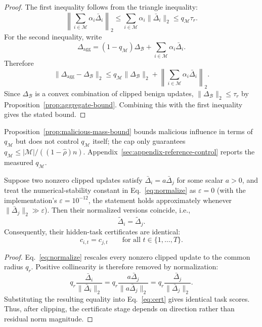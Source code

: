 \begin{proof}
The first inequality follows from the triangle inequality:
\[
\left\|\sum_{i\in\mathcal{M}}\alpha_i\bar{\Delta}_i\right\|_2
\le
\sum_{i\in\mathcal{M}}\alpha_i\|\bar{\Delta}_i\|_2
\le q_{\mathcal{M}}\tau_r.
\]
For the second inequality, write
\[
\Delta_{\mathrm{agg}}=
(1-q_{\mathcal{M}})\Delta_{\mathcal{B}}
+\sum_{i\in\mathcal{M}}\alpha_i\bar{\Delta}_i.
\]
Therefore
\[
\|\Delta_{\mathrm{agg}}-\Delta_{\mathcal{B}}\|_2
\le
q_{\mathcal{M}}\|\Delta_{\mathcal{B}}\|_2
+\left\|\sum_{i\in\mathcal{M}}\alpha_i\bar{\Delta}_i\right\|_2.
\]
Since $\Delta_{\mathcal{B}}$ is a convex combination of clipped benign updates, $\|\Delta_{\mathcal{B}}\|_2\le\tau_r$ by Proposition~\ref{prop:aggregate-bound}. Combining this with the first inequality gives the stated bound.
\end{proof}

Proposition~\ref{prop:malicious-mass-bound} bounds malicious influence in terms of $q_{\mathcal{M}}$ but does not control $q_{\mathcal{M}}$ itself; the cap only guarantees $q_{\mathcal{M}}\le|\mathcal{M}|/((1-\hat{\rho})n)$. Appendix~\ref{sec:appendix-reference-control} reports the measured $q_{\mathcal{M}}$.

\begin{proposition}
\label{prop:directional-invariance}
Suppose two nonzero clipped updates satisfy $\bar{\Delta}_i = a \bar{\Delta}_j$ for some scalar $a>0$, and treat the numerical-stability constant in Eq.~\eqref{eq:normalize} as $\varepsilon=0$ (with the implementation's $\varepsilon=10^{-12}$, the statement holds approximately whenever $\|\bar{\Delta}_j\|_2\gg\varepsilon$). Then their normalized versions coincide, i.e.,
\[
\tilde{\Delta}_i=\tilde{\Delta}_j.
\]
Consequently, their hidden-task certificates are identical:
\[
c_{i,t}=c_{j,t}\qquad \text{for all } t \in \{1,\dots,T\}.
\]
\end{proposition}

\begin{proof}
Eq.~\eqref{eq:normalize} rescales every nonzero clipped update to the common radius $q_r$. Positive collinearity is therefore removed by normalization:
\[
q_r\frac{\bar{\Delta}_i}{\|\bar{\Delta}_i\|_2}
=
q_r\frac{a\bar{\Delta}_j}{\|a\bar{\Delta}_j\|_2}
=
q_r\frac{\bar{\Delta}_j}{\|\bar{\Delta}_j\|_2}.
\]
Substituting the resulting equality into Eq.~\eqref{eq:cert} gives identical task scores. Thus, after clipping, the certificate stage depends on direction rather than residual norm magnitude.
\end{proof}

